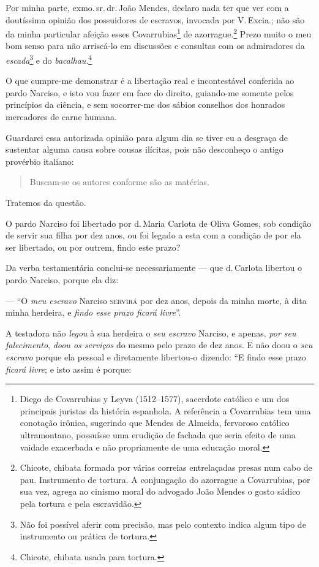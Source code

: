 Por minha parte, exmo.\,sr.\,dr.\,João Mendes, declaro nada ter que ver com
a doutíssima opinião dos possuidores de escravos, invocada por V.\,Excia.; não são da minha particular afeição esses Covarrubias\footnote{
  Diego de Covarrubias y Leyva (1512--1577), sacerdote católico e um dos
  principais juristas da história espanhola. A referência a Covarrubias
  tem uma conotação irônica, sugerindo que Mendes de Almeida, fervoroso
  católico ultramontano, possuísse uma erudição de fachada que seria
  efeito de uma vaidade exacerbada e não propriamente de uma educação
  moral.} de azorrague.\footnote{ Chicote,
  chibata formada por várias correias entrelaçadas presas num cabo de
  pau. Instrumento de tortura. A conjungação do azorrague a Covarrubias,
  por sua vez, agrega ao cinismo moral do advogado João Mendes o gosto
  sádico pela tortura e pela escravidão.} Prezo muito o meu bom senso
para não arriscá-lo em discussões e consultas com os admiradores da
\emph{escada}\footnote{ Não foi possível aferir com precisão, mas
  pelo contexto indica algum tipo de instrumento ou prática de tortura.}
e do \emph{bacalhau}.\footnote{ Chicote, chibata usada para tortura.}

O que cumpre-me demonstrar é a libertação real e incontestável conferida
ao pardo Narciso, e isto vou fazer em face do direito, guiando-me
somente pelos princípios da ciência, e sem socorrer-me dos sábios
conselhos dos honrados mercadores de carne humana.

Guardarei essa autorizada opinião para algum dia se tiver eu a desgraça
de sustentar alguma causa sobre cousas ilícitas, pois não desconheço o
antigo provérbio italiano:

\begin{quote}
Buscam-se os autores conforme são as matérias.
\end{quote}

Tratemos da questão.

O pardo Narciso foi libertado por d.\,Maria Carlota de Oliva Gomes, sob
condição de servir sua filha por dez anos, ou foi legado a esta com a
condição de por ela ser libertado, ou por outrem, findo este prazo?

Da verba testamentária conclui-se necessariamente --- que d.\,Carlota
libertou o pardo Narciso, porque ela diz:

--- ``O \emph{meu escravo} Narciso \textsc{servirá} por dez anos, depois da minha
morte, à dita minha herdeira, e \emph{findo esse prazo ficará livre}''.

A testadora não \emph{legou} à sua herdeira o \emph{seu escravo}
Narciso, e apenas, \emph{por seu falecimento}, \emph{doou os serviços}
do mesmo pelo prazo de dez anos. E não doou o \emph{seu escravo} porque
ela pessoal e diretamente libertou-o dizendo: ``E findo esse prazo
\emph{ficará livre}; e isto assim é porque:

